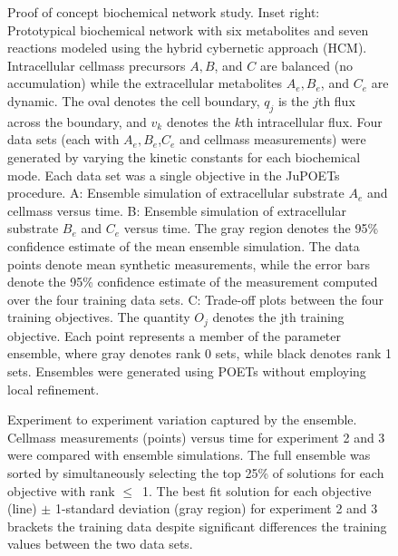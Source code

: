 \documentclass{bmcart}
\begin{document}
\begin{backmatter}
\begin{figure}[h]
  \caption{Proof of concept biochemical network study.
  Inset right: Prototypical biochemical network with six metabolites and seven reactions modeled using the hybrid cybernetic approach (HCM).
  Intracellular cellmass precursors $A,B$, and $C$ are balanced (no accumulation) while the extracellular metabolites $A_{e},B_{e}$, and $C_{e}$ are dynamic.
  The oval denotes the cell boundary, $q_{j}$ is the $j$th flux across the boundary, and $v_{k}$ denotes the $k$th intracellular flux.
  Four data sets (each with $A_{e},B_{e}$,$C_{e}$ and cellmass measurements) were generated by varying the kinetic constants for each biochemical mode.
  Each data set was a single objective in the JuPOETs procedure.
  A: Ensemble simulation of extracellular substrate $A_{e}$ and cellmass versus time.
  B: Ensemble simulation of extracellular substrate $B_{e}$ and $C_{e}$ versus time.
  The gray region denotes the 95\% confidence estimate of the mean ensemble simulation.
  The data points denote mean synthetic measurements, while the error bars denote the 95\% confidence estimate of the measurement computed over the four training data sets.
  C: Trade-off plots between the four training objectives. The quantity $O_{j}$ denotes the jth training objective.
  Each point represents a member of the parameter ensemble, where gray denotes rank 0 sets, while black denotes rank 1 sets. Ensembles were generated using POETs without employing local refinement.
   }\label{fig:fig-biochemical}
\end{figure}

\begin{figure}[h]
  \caption{Experiment to experiment variation captured by the ensemble.
  Cellmass measurements (points) versus time for experiment 2 and 3 were compared with ensemble simulations.
  The full ensemble was sorted by simultaneously selecting the top 25\% of solutions for each objective with rank $\leq$~1.
  The best fit solution for each objective (line) $\pm$ 1-standard deviation (gray region) for experiment 2 and 3 brackets the training data despite significant differences the training values between the two data sets.}\label{fig:fig-experiment-variation}
\end{figure}


\clearpage

\end{backmatter}
\end{document}
